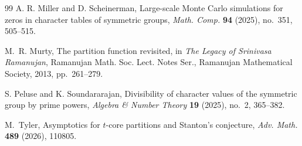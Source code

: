 \documentclass[11pt]{amsart}
\theoremstyle{plain}
\numberwithin{equation}{section}
\begin{document}
\begin{thebibliography}{99}
		A. R. Miller and D. Scheinerman,
		Large-scale Monte Carlo simulations for zeros in character tables of symmetric groups,
		\emph{Math. Comp.} \textbf{94} (2025), no.~351, 505--515.
		
		M.~R. Murty,
		\newblock The partition function revisited,
		\newblock in \emph{The Legacy of Srinivasa Ramanujan},
		Ramanujan Math. Soc. Lect. Notes Ser., Ramanujan Mathematical Society,
		2013, pp.~261--279.
		
		S. Peluse and K. Soundararajan,
		Divisibility of character values of the symmetric group by prime powers,
		\emph{Algebra \& Number Theory} \textbf{19} (2025), no.~2, 365--382.
		
		M.~Tyler,
		\newblock Asymptotics for $t$-core partitions and {S}tanton's conjecture,
		\newblock \emph{Adv. Math.} \textbf{489} (2026), 110805.
		
	\end{thebibliography}	
\end{document}
